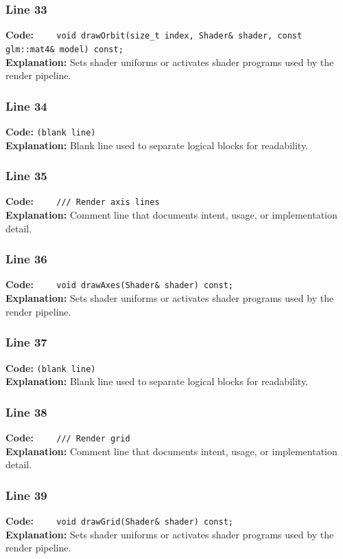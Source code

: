 \documentclass[11pt,a4paper]{article}
\begin{document}
\subsubsection*{Line 33}
\textbf{Code:} \verb|    void drawOrbit(size_t index, Shader& shader, const glm::mat4& model) const;|\\
\textbf{Explanation:} Sets shader uniforms or activates shader programs used by the render pipeline.

\subsubsection*{Line 34}
\textbf{Code:} \texttt{(blank line)}\\
\textbf{Explanation:} Blank line used to separate logical blocks for readability.

\subsubsection*{Line 35}
\textbf{Code:} \verb|    /// Render axis lines|\\
\textbf{Explanation:} Comment line that documents intent, usage, or implementation detail.

\subsubsection*{Line 36}
\textbf{Code:} \verb|    void drawAxes(Shader& shader) const;|\\
\textbf{Explanation:} Sets shader uniforms or activates shader programs used by the render pipeline.

\subsubsection*{Line 37}
\textbf{Code:} \texttt{(blank line)}\\
\textbf{Explanation:} Blank line used to separate logical blocks for readability.

\subsubsection*{Line 38}
\textbf{Code:} \verb|    /// Render grid|\\
\textbf{Explanation:} Comment line that documents intent, usage, or implementation detail.

\subsubsection*{Line 39}
\textbf{Code:} \verb|    void drawGrid(Shader& shader) const;|\\
\textbf{Explanation:} Sets shader uniforms or activates shader programs used by the render pipeline.
\end{document}
